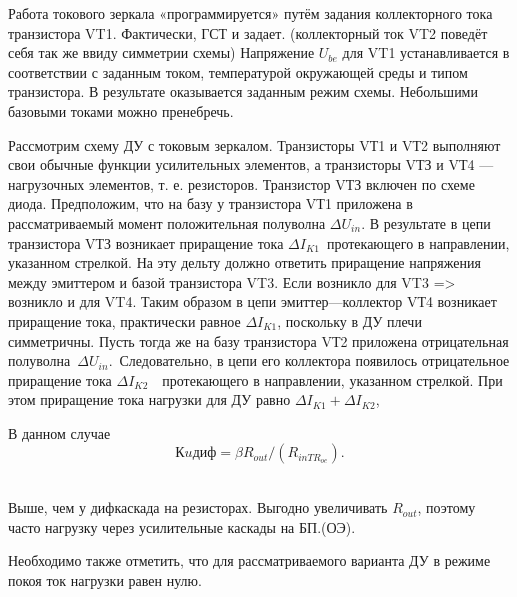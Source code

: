 Работа токового зеркала «программируется» путём задания коллекторного тока транзистора VT1. Фактически, ГСТ и задает. (коллекторный ток VT2 поведёт себя так же ввиду симметрии схемы) Напряжение $U_{be}$ для VT1 устанавливается в соответствии с заданным током, температурой окружающей среды и типом транзистора. В результате оказывается заданным режим схемы. Небольшими базовыми токами можно пренебречь.

Рассмот­рим схему ДУ с токовым зеркалом. Транзисторы VТ1 и VТ2 выполняют свои обычные функции усилительных элементов, а транзисторы VТЗ и VТ4 — нагрузочных элементов, т. е. резисторов. Транзистор VТЗ включен по схеме диода. Предположим, что на базу у транзистора VТ1 приложена в рассматриваемый момент положительная полуволна $\Delta U_{in}$. В результате в цепи транзистора VТЗ возникает приращение тока $\Delta I_{K1}$ протекающего в направлении, указанном стрелкой. На эту дельту должно ответить приращение напряжения между эмиттером и базой транзистора VT3. Если возникло для VT3 => возникло и для VT4. Таким образом в цепи эмиттер—коллектор VТ4 возникает приращение тока, практически равное $\Delta I_{K1}$, поскольку в ДУ плечи симметричны. Пусть тогда же на базу транзистора VТ2 приложена отрицательная полуволна $\Delta U_{in}$. Следовательно, в цепи его коллектора появилось отрицательное приращение тока $\Delta I_{K2}$  протекающего в направлении, указанном стрелкой. При этом приращение тока нагрузки для ДУ равно $\Delta I_{K1} + \Delta I_{K2}$, 

В данном случае
$$
Кuдиф = \beta R_{out}/(R_{inTR_{oe}}).
$$  

Выше, чем у дифкаскада на резисторах. Выгодно увеличивать $R_{out}$, поэтому часто нагрузку через усилительные каскады на БП.(ОЭ).

Необходимо также отметить, что для рассматриваемого варианта ДУ в режиме покоя ток нагрузки равен нулю.
